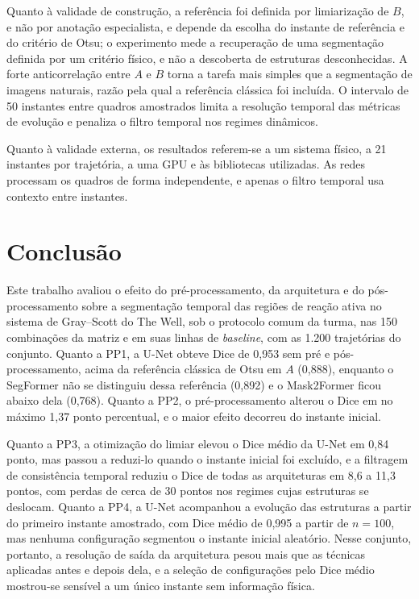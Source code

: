\documentclass[12pt]{article}
\begin{document}
Quanto à validade de construção, a referência foi definida por limiarização de $B$, e não por anotação especialista, e depende da escolha do instante de referência e do critério de Otsu; o experimento mede a recuperação de uma segmentação definida por um critério físico, e não a descoberta de estruturas desconhecidas. A forte anticorrelação entre $A$ e $B$ torna a tarefa mais simples que a segmentação de imagens naturais, razão pela qual a referência clássica foi incluída. O intervalo de 50 instantes entre quadros amostrados limita a resolução temporal das métricas de evolução e penaliza o filtro temporal nos regimes dinâmicos.

Quanto à validade externa, os resultados referem-se a um sistema físico, a 21 instantes por trajetória, a uma GPU e às bibliotecas utilizadas. As redes processam os quadros de forma independente, e apenas o filtro temporal usa contexto entre instantes.

\section{Conclusão}
\label{sec:conclusao}

Este trabalho avaliou o efeito do pré-processamento, da arquitetura e do pós-processamento sobre a segmentação temporal das regiões de reação ativa no sistema de Gray--Scott do The Well, sob o protocolo comum da turma, nas 150 combinações da matriz e em suas linhas de \textit{baseline}, com as 1.200 trajetórias do conjunto. Quanto a PP1, a U-Net obteve Dice de 0,953 sem pré e pós-processamento, acima da referência clássica de Otsu em $A$ (0,888), enquanto o SegFormer não se distinguiu dessa referência (0,892) e o Mask2Former ficou abaixo dela (0,768). Quanto a PP2, o pré-processamento alterou o Dice em no máximo 1,37 ponto percentual, e o maior efeito decorreu do instante inicial.

Quanto a PP3, a otimização do limiar elevou o Dice médio da U-Net em 0,84 ponto, mas passou a reduzi-lo quando o instante inicial foi excluído, e a filtragem de consistência temporal reduziu o Dice de todas as arquiteturas em 8,6 a 11,3 pontos, com perdas de cerca de 30 pontos nos regimes cujas estruturas se deslocam. Quanto a PP4, a U-Net acompanhou a evolução das estruturas a partir do primeiro instante amostrado, com Dice médio de 0,995 a partir de $n=100$, mas nenhuma configuração segmentou o instante inicial aleatório. Nesse conjunto, portanto, a resolução de saída da arquitetura pesou mais que as técnicas aplicadas antes e depois dela, e a seleção de configurações pelo Dice médio mostrou-se sensível a um único instante sem informação física.
\end{document}
